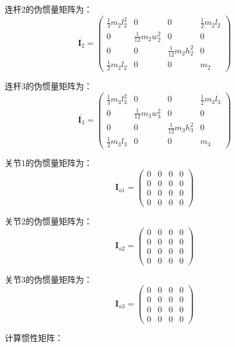 \documentclass{homework}
\begin{document}
\begin{sol}
连杆2的伪惯量矩阵为：
\[
  \overline{\mathbf{I}_2} = 
  \begin{pmatrix}
    \frac{1}{3} m_2 l_2^2 & 0 & 0 & \frac{1}{2} m_2 l_2 \\
    0 & \frac{1}{12} m_2 w_2^2 & 0 & 0 \\
    0 & 0 & \frac{1}{12} m_2 h_2^2 & 0 \\
    \frac{1}{2} m_2 l_2 & 0 & 0 & m_2
  \end{pmatrix}
\]

连杆3的伪惯量矩阵为：
\[
  \overline{\mathbf{I}_3} = 
  \begin{pmatrix}
    \frac{1}{3} m_3 l_3^2 & 0 & 0 & \frac{1}{2} m_3 l_3 \\
    0 & \frac{1}{12} m_3 w_3^2 & 0 & 0 \\
    0 & 0 & \frac{1}{12} m_3 h_3^2 & 0 \\
    \frac{1}{2} m_3 l_3 & 0 & 0 & m_3
  \end{pmatrix}
\]

关节1的伪惯量矩阵为：
\[
  \mathbf{I}_{a1} = 
  \begin{pmatrix}
    0 & 0 & 0 & 0 \\
    0 & 0 & 0 & 0 \\
    0 & 0 & 0 & 0 \\
    0 & 0 & 0 & 0 
  \end{pmatrix}
\]

关节2的伪惯量矩阵为：
\[
  \mathbf{I}_{a2} = 
  \begin{pmatrix}
    0 & 0 & 0 & 0 \\
    0 & 0 & 0 & 0 \\
    0 & 0 & 0 & 0 \\
    0 & 0 & 0 & 0 
  \end{pmatrix}
\]

关节3的伪惯量矩阵为：
\[
  \mathbf{I}_{a3} = 
  \begin{pmatrix}
    0 & 0 & 0 & 0 \\
    0 & 0 & 0 & 0 \\
    0 & 0 & 0 & 0 \\
    0 & 0 & 0 & 0 
  \end{pmatrix}
\]

计算惯性矩阵：


\end{sol}
\end{document}
